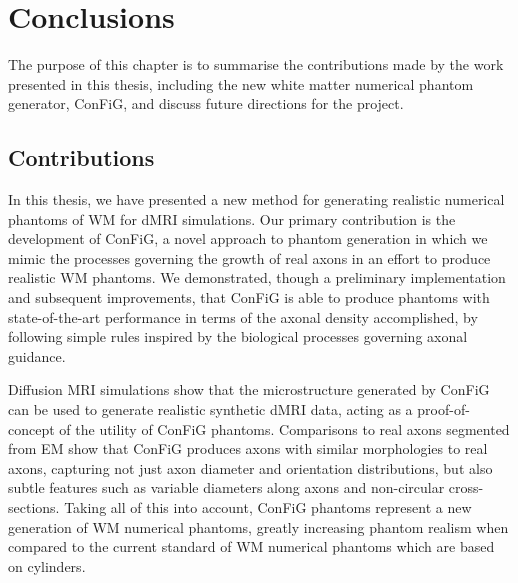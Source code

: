 \chapter{Conclusions}
\label{chap:conclusion}

\chaptertoc{}

\begin{chapterabstract}
The purpose of this chapter is to summarise the contributions made by the work presented in this thesis, including the new white matter numerical phantom generator, \ac{ConFiG}, and discuss future directions for the project.
\end{chapterabstract}


\section{Contributions}
\label{sec:conc_contributions}
In this thesis, we have presented a new method for generating realistic numerical phantoms of \acf{WM} for \acf{dMRI} simulations.
Our primary contribution is the development of \acf{ConFiG}, a novel approach to phantom generation in which we mimic the processes governing the growth of real axons in an effort to produce realistic \ac{WM} phantoms.
We demonstrated, though a preliminary implementation and subsequent improvements, that \ac{ConFiG} is able to produce phantoms with state-of-the-art performance in terms of the axonal density accomplished, by following simple rules inspired by the biological processes governing axonal guidance.

Diffusion MRI simulations show that the microstructure generated by \ac{ConFiG} can be used to generate realistic synthetic \ac{dMRI} data, acting as a proof-of-concept of the utility of \ac{ConFiG} phantoms.
Comparisons to real axons segmented from \ac{EM} show that \ac{ConFiG} produces axons with similar morphologies to real axons, capturing not just axon diameter and orientation distributions, but also subtle features such as variable diameters along axons and non-circular cross-sections. Taking all of this into account, \ac{ConFiG} phantoms represent a new generation of \ac{WM} numerical phantoms, greatly increasing phantom realism when compared to the current standard of \ac{WM} numerical phantoms which are based on cylinders.

